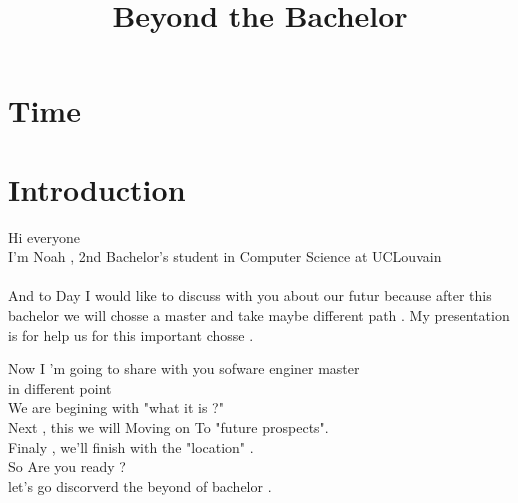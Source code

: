 \documentclass{article}
\title{Beyond the Bachelor}
\begin{document}
\section{Time}
\section{Introduction}
Hi everyone \\
I'm Noah , 2nd Bachelor’s student in Computer Science at UCLouvain \\\\
And to Day I would like to discuss with you about our futur because after this bachelor 
we will chosse a  master and take maybe different path . My presentation is for help us for this 
important chosse . 

Now I 'm going to share with you sofware enginer master \\
in different point \\
We are begining with "what it is ?" \\
Next ,  this  we will Moving on To "future prospects". \\
Finaly , we’ll finish with the "location" .\\
So Are you ready ?\\
let's go discorverd the beyond of bachelor .
\end{document}
